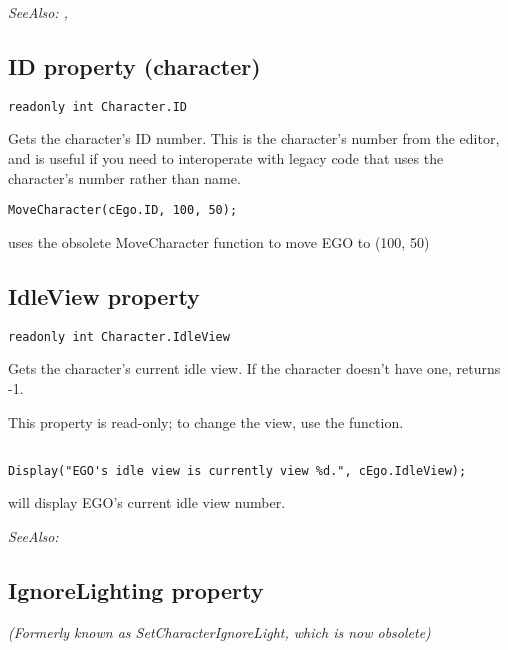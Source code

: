\it{SeeAlso:} ,


\subsection{ID property (character)}\label{Character.ID}%

\begin{verbatim}
readonly int Character.ID
\end{verbatim}
Gets the character's ID number. This is the character's number from the editor, and is
useful if you need to interoperate with legacy code that uses the character's number
rather than name.

\begin{verbatim}
MoveCharacter(cEgo.ID, 100, 50);
\end{verbatim}
uses the obsolete MoveCharacter function to move EGO to (100, 50)


\subsection{IdleView property}\label{Character.IdleView}%

\begin{verbatim}
readonly int Character.IdleView
\end{verbatim}
Gets the character's current idle view. If the character doesn't have one, returns -1.

This property is read-only; to change the view, use the 
function.

\begin{verbatim}

Display("EGO's idle view is currently view %d.", cEgo.IdleView);
\end{verbatim}
will display EGO's current idle view number.

\it{SeeAlso:} 


\subsection{IgnoreLighting property}\label{Character.IgnoreLighting}%

\it{(Formerly known as SetCharacterIgnoreLight, which is now obsolete)}


